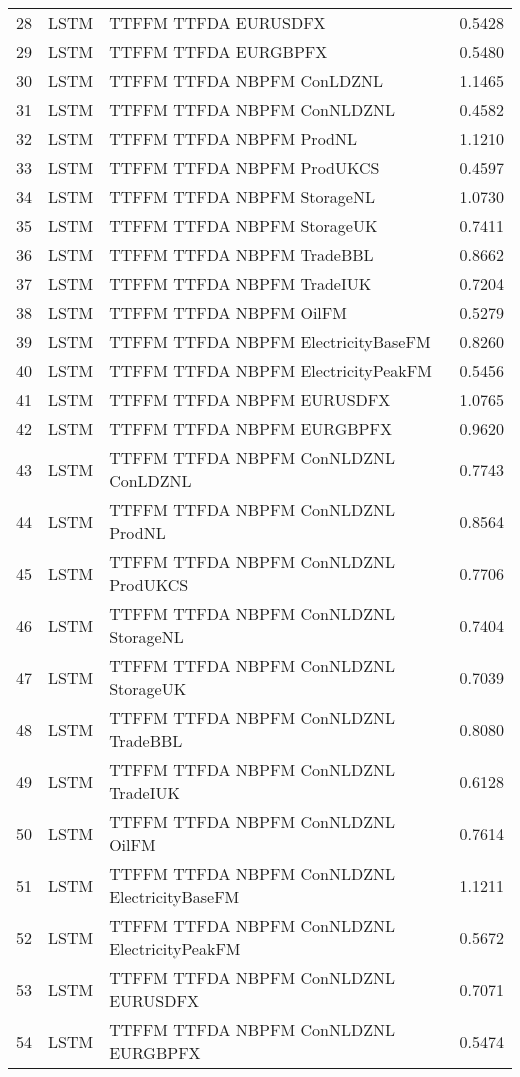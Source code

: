 \begin{table}[ht]
\begin{tabular}{rllr}
  28 & LSTM & TTFFM TTFDA EURUSDFX & 0.5428 \\ 
  29 & LSTM & TTFFM TTFDA EURGBPFX & 0.5480 \\ 
  30 & LSTM & TTFFM TTFDA NBPFM ConLDZNL & 1.1465 \\ 
  31 & LSTM & TTFFM TTFDA NBPFM ConNLDZNL & 0.4582 \\ 
  32 & LSTM & TTFFM TTFDA NBPFM ProdNL & 1.1210 \\ 
  33 & LSTM & TTFFM TTFDA NBPFM ProdUKCS & 0.4597 \\ 
  34 & LSTM & TTFFM TTFDA NBPFM StorageNL & 1.0730 \\ 
  35 & LSTM & TTFFM TTFDA NBPFM StorageUK & 0.7411 \\ 
  36 & LSTM & TTFFM TTFDA NBPFM TradeBBL & 0.8662 \\ 
  37 & LSTM & TTFFM TTFDA NBPFM TradeIUK & 0.7204 \\ 
  38 & LSTM & TTFFM TTFDA NBPFM OilFM & 0.5279 \\ 
  39 & LSTM & TTFFM TTFDA NBPFM ElectricityBaseFM & 0.8260 \\ 
  40 & LSTM & TTFFM TTFDA NBPFM ElectricityPeakFM & 0.5456 \\ 
  41 & LSTM & TTFFM TTFDA NBPFM EURUSDFX & 1.0765 \\ 
  42 & LSTM & TTFFM TTFDA NBPFM EURGBPFX & 0.9620 \\ 
  43 & LSTM & TTFFM TTFDA NBPFM ConNLDZNL ConLDZNL & 0.7743 \\ 
  44 & LSTM & TTFFM TTFDA NBPFM ConNLDZNL ProdNL & 0.8564 \\ 
  45 & LSTM & TTFFM TTFDA NBPFM ConNLDZNL ProdUKCS & 0.7706 \\ 
  46 & LSTM & TTFFM TTFDA NBPFM ConNLDZNL StorageNL & 0.7404 \\ 
  47 & LSTM & TTFFM TTFDA NBPFM ConNLDZNL StorageUK & 0.7039 \\ 
  48 & LSTM & TTFFM TTFDA NBPFM ConNLDZNL TradeBBL & 0.8080 \\ 
  49 & LSTM & TTFFM TTFDA NBPFM ConNLDZNL TradeIUK & 0.6128 \\ 
  50 & LSTM & TTFFM TTFDA NBPFM ConNLDZNL OilFM & 0.7614 \\ 
  51 & LSTM & TTFFM TTFDA NBPFM ConNLDZNL ElectricityBaseFM & 1.1211 \\ 
  52 & LSTM & TTFFM TTFDA NBPFM ConNLDZNL ElectricityPeakFM & 0.5672 \\ 
  53 & LSTM & TTFFM TTFDA NBPFM ConNLDZNL EURUSDFX & 0.7071 \\ 
  54 & LSTM & TTFFM TTFDA NBPFM ConNLDZNL EURGBPFX & 0.5474 \\ 

\end{tabular}
\end{table}
